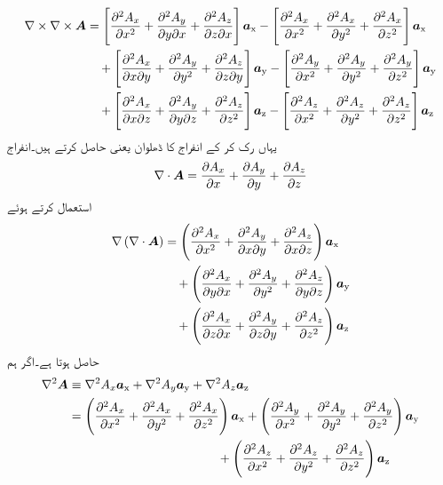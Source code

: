 \begin{gather}
\begin{aligned}\label{مساوات_مقناطیسی_گردش_کی_گردش_الف}
\nabla \times \nabla \times {\ensuremath{{\boldsymbol{A}}}}&=\left[\frac{\partial^2 A_x}{\partial x^2}+\frac{\partial^2 A_y}{\partial y\partial x}+\frac{\partial^2 A_z}{\partial z\partial x}\right]{\boldsymbol{a}}_{\textup{x}}-\left[\frac{\partial^2 A_x}{\partial x^2}+\frac{\partial^2 A_x}{\partial y^2} +\frac{\partial^2 A_x}{\partial z^2} \right]{\boldsymbol{a}}_{\textup{x}}\\
& \quad +\left[\frac{\partial^2 A_x}{\partial x\partial y}+\frac{\partial^2 A_y}{\partial y^2}+ \frac{\partial^2 A_z}{\partial z\partial y}\right]{\boldsymbol{a}}_{\textup{y}}-\left[\frac{\partial^2 A_y}{\partial x^2}+\frac{\partial^2 A_y}{\partial y^2}+\frac{\partial^2 A_y}{\partial z^2} \right]{\boldsymbol{a}}_{\textup{y}}\\
&\quad +\left[ \frac{\partial^2 A_x}{\partial x\partial z}+\frac{\partial^2 A_y}{\partial y\partial z}+\frac{\partial^2 A_z}{\partial z^2}\right]{\boldsymbol{a}}_{\textup{z}}-\left[\frac{\partial^2 A_z}{\partial x^2}+\frac{\partial^2 A_z}{\partial y^2}+ \frac{\partial^2 A_z}{\partial z^2} \right]{\boldsymbol{a}}_{\textup{z}}
\end{aligned}
\end{gather}
یہاں رک کر  کے انفراج کا ڈھلوان یعنی  حاصل کرتے ہیں۔انفراج
\begin{align*}
\nabla \cdot {\ensuremath{{\boldsymbol{A}}}}=\frac{\partial A_x}{\partial x}+\frac{\partial A_y}{\partial y}+\frac{\partial A_z}{\partial z}
\end{align*}
استعمال کرتے ہوئے
\begin{gather}
\begin{aligned}
\nabla \left(\nabla \cdot {\ensuremath{{\boldsymbol{A}}}} \right)&=\left(\frac{\partial^2 A_x}{\partial x^2}+\frac{\partial^2 A_y}{\partial x  \partial y}+\frac{\partial^2 A_z}{\partial x  \partial z} \right){\boldsymbol{a}}_{\textup{x}}\\
&\quad +\left(\frac{\partial^2 A_x}{\partial y \partial x}+\frac{\partial^2 A_y}{\partial y^2}+\frac{\partial^2 A_z}{\partial y  \partial z} \right){\boldsymbol{a}}_{\textup{y}}\\
&\quad +\left(\frac{\partial^2 A_x}{\partial z \partial x}+\frac{\partial^2 A_y}{\partial z\partial y}+\frac{\partial^2 A_z}{\partial z^2} \right){\boldsymbol{a}}_{\textup{z}}\\
\end{aligned}
\end{gather}
حاصل ہوتا ہے۔اگر ہم
\begin{gather}
\begin{aligned}\label{مساوات_مقناطیسی_سمتی_لاپلاسی}
\begin{split}
\nabla^2 {{\boldsymbol{A}}} &\equiv \nabla^2 A_x {\boldsymbol{a}}_{\textup{x}}+\nabla^2 A_y {\boldsymbol{a}}_{\textup{y}}+\nabla^2 A_z {\boldsymbol{a}}_{\textup{z}}\\
&=\left(\frac{\partial^2 A_x}{\partial x^2}+\frac{\partial^2 A_x}{\partial y^2}+\frac{\partial^2 A_x}{\partial z^2} \right){\boldsymbol{a}}_{\textup{x}}+\left(\frac{\partial^2 A_y}{\partial x^2}+\frac{\partial^2 A_y}{\partial y^2}+\frac{\partial^2 A_y}{\partial z^2} \right){\boldsymbol{a}}_{\textup{y}} \\ 
& \quad \quad \quad \quad  \quad \quad\quad \quad \quad \quad  \quad \quad  +\left(\frac{\partial^2 A_z}{\partial x^2}+\frac{\partial^2 A_z}{\partial y^2}+\frac{\partial^2 A_z}{\partial z^2} \right){\boldsymbol{a}}_{\textup{z}}
\end{split}
\end{aligned}
\end{gather}
